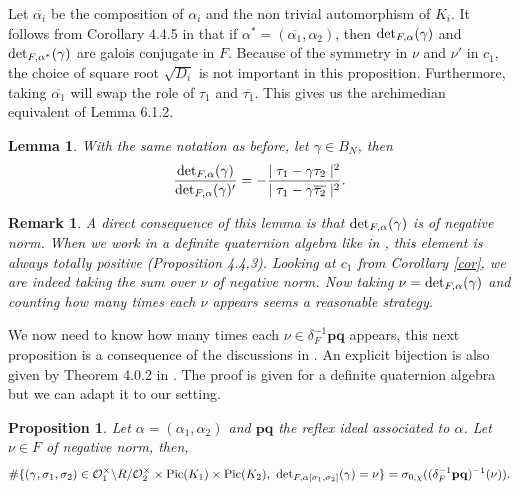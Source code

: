 \documentclass[a4paper,12pt]{article}
\newtheorem{proposition}[theorem]{Proposition}
\newtheorem{remark}[theorem]{Remark}
\newtheorem{lemma}[theorem]{Lemma}
\begin{document}
Let $\overline{\alpha_i}$ be the composition of $\alpha_i$ and the non trivial automorphism of $K_i$. It follows from Corollary 4.4.5 in \cite{Daas} that if $\alpha^*=(\overline{\alpha_1},\alpha_2)$, then $\textup{det}_{F,\alpha}(\gamma)$ and $\textup{det}_{F,\alpha^*}(\gamma)$ are galois conjugate in $F$. Because of the symmetry in $\nu$ and $\nu'$ in $c_1$, the choice of square root $\sqrt{D_i}$ is not important in this proposition.
Furthermore, taking $\overline{\alpha_1}$ will swap the role of $\tau_1$ and $\overline{\tau_1}$. This gives us the archimedian equivalent of Lemma 6.1.2.
\begin{lemma}
    With the same notation as before, let $\gamma\in B_N$, then 
    \[ \frac{\textup{det}_{F,\alpha}(\gamma)}{\textup{det}_{F,\alpha}(\gamma)'}=-\frac{\mid\tau_1-\gamma\tau_2\mid^2}{\mid\tau_1-\gamma\overline{\tau_2}\mid^2}.\]
\end{lemma}

\begin{remark}\label{remark sign det}
    A direct consequence of this lemma is that $\textup{det}_{F,\alpha}(\gamma)$ is of negative norm. When we work in a definite quaternion algebra like in \cite{Daas}, this element is always totally positive (Proposition 4.4.3).  Looking at $c_1$ from Corollary \ref{cor}, we are indeed taking the sum over $\nu$ of negative norm. Now taking $\nu=\textup{det}_{F,\alpha}(\gamma)$ and counting how many times each $\nu$ appears seems a reasonable strategy.
\end{remark}
We now need to know how many times each $\nu \in \delta_F^{-1}\mathbf{p}\mathbf{q} $ appears, this next proposition is a consequence of the discussions in \cite{HowardYang}. An explicit bijection is also given by Theorem 4.0.2 in \cite{Daas}. The proof is given for a definite quaternion algebra but we can adapt it to our setting. 

\begin{proposition}
\label{counting thm}
    Let $\alpha=(\alpha_1,\alpha_2)$ and $\mathbf{p}\mathbf{q}$ the reflex ideal associated to $\alpha$. Let $\nu\in F$ of negative norm, then,
    \begin{align*}
    \#\{(\gamma,\sigma_1,\sigma_2)\in \mathcal{O}_1^\times\backslash R/ \mathcal{O}_2^\times\times \textup{Pic}(K_1)\times\textup{Pic}(K_2),\,\, \textup{det}_{F,\alpha[\sigma_1,\sigma_2]}(\gamma)=\nu\}
    =\sigma_{0,\chi}((\delta_F^{-1}\mathbf{p}\mathbf{q})^{-1}(\nu)).
        \end{align*}
\end{proposition}
\end{document}

